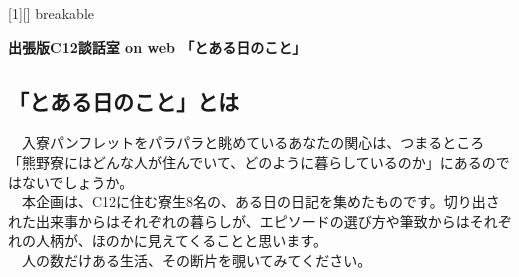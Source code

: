 

\setlength{\parskip}{1em}
\setlength{\parindent}{0pt} 

[1][]{%
  breakable           %
}


\begin{center}
    \Large\textbf{出張版C12談話室 on web 「とある日のこと」}\\
    \vspace{1em}
\end{center}

\vspace{1em}

\subsection{「とある日のこと」とは}
\noindent
　入寮パンフレットをパラパラと眺めているあなたの関心は、つまるところ「熊野寮にはどんな人が住んでいて、どのように暮らしているのか」にあるのではないでしょうか。\\
　本企画は、C12に住む寮生8名の、ある日の日記を集めたものです。切り出された出来事からはそれぞれの暮らしが、エピソードの選び方や筆致からはそれぞれの人柄が、ほのかに見えてくることと思います。\\
　人の数だけある生活、その断片を覗いてみてください。\\


